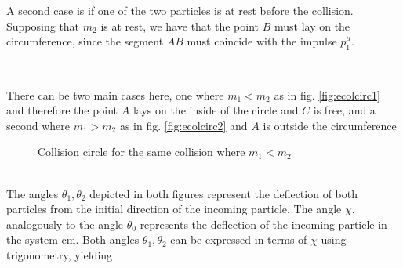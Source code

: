 \documentclass[../admech.tex]{subfiles}
\begin{document}
\begin{minipage}[c]{0.5\textwidth}
	A second case is if one of the two particles is at rest before the collision. Supposing that $m_2$ is at rest, we have that the point $B$ must lay on the circumference, since the segment $AB$ must coincide with the impulse $p_1^\mu$.
\end{minipage}\\
\begin{minipage}[c]{0.5\textwidth}
	There can be two main cases here, one where $m_1<m_2$ as in fig. \eqref{fig:ecolcirc1} and therefore the point $A$ lays on the inside of the circle and $C$ is free, and a second where $m_1>m_2$ as in fig. \eqref{fig:ecolcirc2} and $A$ is outside the circumference
\end{minipage}
\begin{minipage}[c]{0.5\textwidth}
	\begin{figure}[H]
		\centering
		\caption{Collision circle for the same collision where $m_1<m_2$}
		\label{fig:ecolcirc2}
	\end{figure}
\end{minipage}\\
The angles $\theta_1,\theta_2$ depicted in both figures represent the deflection of both particles from the initial direction of the incoming particle. The angle $\chi$, analogously to the angle $\theta_0$ represents the deflection of the incoming particle in the system cm. Both angles $\theta_1,\theta_2$ can be expressed in terms of $\chi$ using trigonometry, yielding
\end{document}
